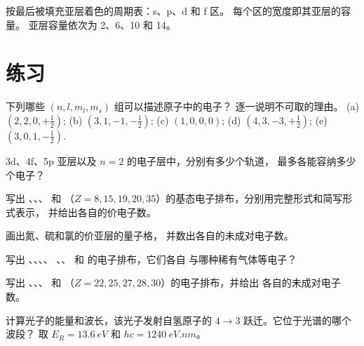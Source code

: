 \begin{omfigure}
\omperiodictable[colour=blocks, legend]

{\small 按最后被填充亚层着色的周期表：s、p、d 和 f 区。
每个区的宽度即其亚层的容量。
亚层容量依次为 2、6、10 和 14。}
\end{omfigure}

\section{练习}

\begin{exercise}[$\star$]\label{exo:b1:quantum-numbers:1}
下列哪些 $(n, l, m_l, m_s)$ 组可以描述原子中的电子？
逐一说明不可取的理由。
(a) $(2, 2, 0, +\tfrac12)$; (b) $(3, 1, -1, -\tfrac12)$;
(c) $(1, 0, 0, 0)$; (d) $(4, 3, -3, +\tfrac12)$; (e) $(3, 0, 1, -\tfrac12)$.
\end{exercise}

\begin{exercise}[$\star$]\label{exo:b1:quantum-numbers:2}
3d、4f、5p 亚层以及 $n = 2$ 的电子层中，分别有多少个轨道，
最多各能容纳多少个电子？
\end{exercise}

\begin{exercise}[$\star$]\label{exo:b1:quantum-numbers:3}
写出 、、、
和 （$Z = 8, 15, 19, 20, 35$）的基态电子排布，分别用完整形式和简写形式表示，
并给出各自的价电子数。
\end{exercise}

\begin{exercise}[$\star$]\label{exo:b1:quantum-numbers:4}
画出氮、硫和氯的价亚层的量子格，
并数出各自的未成对电子数。
\end{exercise}

\begin{exercise}[$\star\star$]\label{exo:b1:quantum-numbers:5}
写出 、、、、
、、 和  的电子排布，它们各自
与哪种稀有气体等电子？
\end{exercise}

\begin{exercise}[$\star\star$]\label{exo:b1:quantum-numbers:6}
写出 、、、
 和 （$Z = 22, 25, 27, 28, 30$）的电子排布，并给出
各自的未成对电子数。
\end{exercise}

\begin{exercise}[$\star\star$]\label{exo:b1:quantum-numbers:7}
计算光子的能量和波长，该光子发射自氢原子的
$4 \to 3$ 跃迁。它位于光谱的哪个波段？
取 $E_R = \qty{13.6}{eV}$ 和 $hc = \qty{1240}{eV.nm}$。
\end{exercise}

